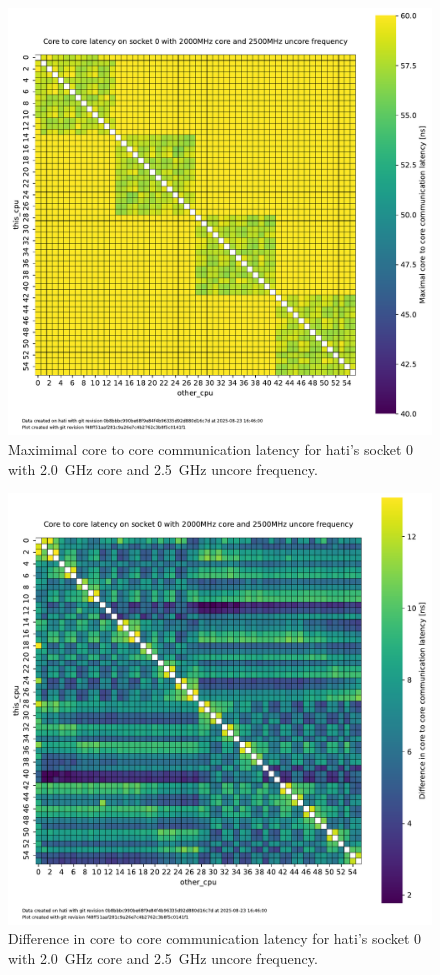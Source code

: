 \begin{figure}[]
    \centering
    \includegraphics[width=\columnwidth]{fig/core-to-core-latency/core-to-core-heatmap-max-2000-2500.pdf}
    \caption{Maximimal core to core communication latency for hati's socket 0 with \SI{2.0}{\GHz} core and \SI{2.5}{\GHz} uncore frequency.}
\end{figure}
\begin{figure}[]
    \centering
    \includegraphics[width=\columnwidth]{fig/core-to-core-latency/core-to-core-heatmap-diff-2000-2500.pdf}
    \caption{Difference in core to core communication latency for hati's socket 0 with \SI{2.0}{\GHz} core and \SI{2.5}{\GHz} uncore frequency.}
\end{figure}

